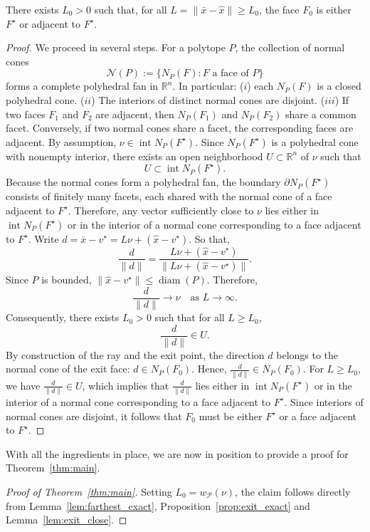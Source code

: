 \begin{lemma}\label{lem:exit_close}
There exists $L_0 > 0$ such that, for all
$L = \|\bar{x} - \hat{x}\| \ge L_0$, the face $F_0$ is either $F^\star$ or adjacent to $F^\star$.
\end{lemma}
\begin{proof}
We proceed in several steps. For a polytope $P$, the collection of normal cones
\[
\mathcal{N}(P) := \{ N_P(F) : F \text{ a face of } P \}
\]
forms a complete polyhedral fan in $\mathbb{R}^n$.
In particular: ($i$) each $N_P(F)$ is a closed polyhedral cone.
($ii$) The interiors of distinct normal cones are disjoint.
($iii$) If two faces $F_1$ and $F_2$ are adjacent, then
$N_P(F_1)$ and $N_P(F_2)$ share a common facet.
Conversely, if two normal cones share a facet, the corresponding faces are adjacent.
By assumption, $\nu \in \operatorname{int} N_P(F^\star)$.
Since $N_P(F^\star)$ is a polyhedral cone with nonempty interior,
there exists an open neighborhood $U \subset \mathbb{R}^n$ of $\nu$
such that
\[
U \subset \operatorname{int} N_P(F^\star).
\]
Because the normal cones form a polyhedral fan, the boundary
$\partial N_P(F^\star)$ consists of finitely many facets,
each shared with the normal cone of a face adjacent to $F^\star$.
Therefore, any vector sufficiently close to $\nu$ lies either in
$\operatorname{int} N_P(F^\star)$
or in the interior of a normal cone corresponding to a face adjacent to $F^\star$.
Write
$
d = \bar x - v^\star
= L\nu + (\hat x - v^\star).
$
So that,
\[
\frac{d}{\|d\|}
= \frac{L\nu + (\hat x - v^\star)}{\|L\nu + (\hat x - v^\star)\|}.
\]
Since $P$ is bounded, $\| \hat x - v^\star \| \le \operatorname{diam}(P)$.
Therefore,
\[
\frac{d}{\|d\|} \to \nu
\quad \text{as } L \to \infty.
\]
Consequently, there exists $L_0 > 0$ such that for all
$L \ge L_0$,
\[
\frac{d}{\|d\|} \in U.
\]
By construction of the ray and the exit point,
the direction $d$ belongs to the normal cone of the exit face:
$
d \in N_P(F_0).
$
Hence,
$
\frac{d}{\|d\|} \in N_P(F_0).
$
For $L \ge L_0$, we have $\frac{d}{\|d\|} \in U$,
which implies that
$\frac{d}{\|d\|}$ lies either in
$\operatorname{int} N_P(F^\star)$
or in the interior of a normal cone corresponding to a face adjacent to $F^\star$. Since interiors of normal cones are disjoint,  it follows that $F_0$ must be either $F^\star$
or a face adjacent to $F^\star$.
\end{proof}

\noindent With all the ingredients in place, we are now in position to provide a proof for Theorem~\ref{thm:main}.
\begin{proof}[Proof of Theorem~\ref{thm:main}]
Setting $L_0 = w_{\mathcal P}(\nu)$, the claim follows directly from Lemma~\ref{lem:farthest_exact}, Proposition~\ref{prop:exit_exact} and Lemma~\ref{lem:exit_close}.
\end{proof}

